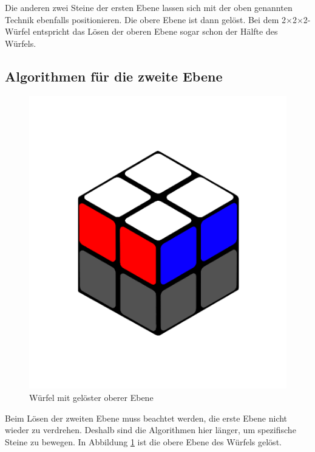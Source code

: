 \documentclass[12pt,a4paper, usenames, dvipsnames]{article}
\theoremstyle{mystyle}
\theoremstyle{definition}
\newcommand{\Ttwo}{2$\times$2$\times$2-}
\begin{document}
Die anderen zwei Steine der ersten Ebene lassen sich mit der oben genannten Technik ebenfalls positionieren. Die obere Ebene ist dann gelöst.
Bei dem \Ttwo Würfel entspricht das Lösen der oberen Ebene sogar schon der Hälfte des Würfels.



%
%
%
%
%
%
%
%
%
%
%
%
%
%
%
%
%
%
%
\subsection*{Algorithmen für die zweite Ebene}

\begin{figure}[h]
\centering
\includegraphics[scale=0.1]{ebene.png}
\caption{Würfel mit gelöster oberer Ebene}
\label{33}
\end{figure}

Beim Lösen der zweiten Ebene muss beachtet werden, die erste Ebene nicht wieder zu verdrehen. Deshalb sind die Algorithmen hier länger, um spezifische Steine zu bewegen.
In Abbildung \ref{33} ist die obere Ebene des Würfels gelöst.
\end{document}
